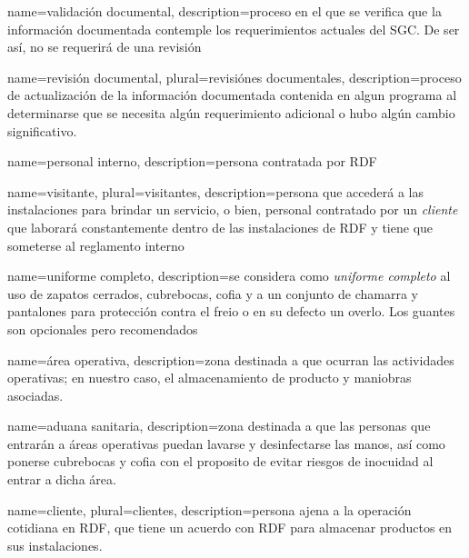 {
    name=validación documental,
    description={proceso en el que se verifica que la información documentada contemple los requerimientos actuales del SGC. De ser así, no se requerirá de una revisión}
}


{
    name=revisión documental,
    plural=revisiónes documentales,
    description={proceso de actualización de la información documentada contenida en algun programa al determinarse que se necesita algún requerimiento adicional o hubo algún cambio significativo.}
}

{
    name=personal interno,
    description={persona contratada por RDF}
}

{
    name=visitante,
    plural=visitantes,
    description={persona que accederá a las instalaciones para brindar un servicio, o bien, personal contratado por un \emph{cliente} que laborará constantemente dentro de las instalaciones de RDF y tiene que someterse al reglamento interno}
}

{
    name=uniforme completo,
    description={se considera como \textit{uniforme completo} al uso de zapatos cerrados, cubrebocas, cofia y a un conjunto de chamarra y pantalones para protección contra el freio o en su defecto un overlo. Los guantes son opcionales pero recomendados}
}

{
    name=área operativa,
    description={zona destinada a que ocurran las actividades operativas; en nuestro caso, el almacenamiento de producto y maniobras asociadas.}
}

{
    name=aduana sanitaria,
    description={zona destinada a que las personas que entrarán a áreas operativas puedan lavarse y desinfectarse las manos, así como ponerse cubrebocas y cofia con el proposito de evitar riesgos de inocuidad al entrar a dicha área.}
}

{
    name=cliente,
    plural=clientes,
    description={persona ajena a la operación cotidiana en RDF, que tiene un acuerdo con RDF para almacenar productos en sus instalaciones.}
}


